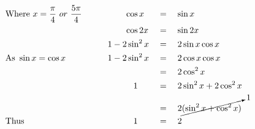 \begin{alignat*}{3}
&\mathrm{Where}~x=\frac{\pi}{4}~or~\frac{5\pi}{4}\qquad&&\qquad\cos{x}&&=\quad\sin{x}\\
&\,&&\qquad\cos{2x}&&=\quad\sin{2x}\\
&\,&&1-2\sin^2{x}&&=\quad2\sin{x}\cos{x}\\
&\mathrm{As}~\sin{x}=\cos{x}\qquad&&1-2\sin^2{x}&&=\quad2\cos{x}\cos{x}\\
&\,&&\,&&=\quad2\cos^2{x}\\
&\,&&\qquad\quad1&&=\quad2\sin^2{x}+2\cos^2{x}\\
&\,&&\,&&=\quad2\cancelto{1}{(\sin^2{x+\cos^2{x}})}\\
&\mathrm{Thus}&&\qquad\quad1&&=\quad2
\end{alignat*}
